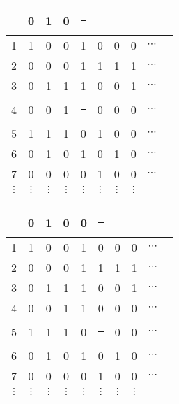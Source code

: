 \documentclass[compress,17pt]{beamer}
\newcommand\hl{\bgroup\markoverwith
    {\textcolor{yellow}{\rule[-.5ex]{.1pt}{2.5ex}}}\ULon}
\begin{document}
\begin{frame}
  \centering
  \begin{tabular}{ | c | c c c c c c c c c }
    \hline
    &  0 & 1 & 0 & \hl 0 \\
    \hline

    1 & 1 & 0 & 0 & 1 & 0 & 0 & 0 & $\cdots$\\
    2 & 0 & 0 & 0 & 1 & 1 & 1 & 1 & $\cdots$\\
    3 & 0 & 1 & 1 & 1 & 0 & 0 & 1 & $\cdots$\\
    4 & 0 & 0 & 1 & \hl 1 & 0 & 0 & 0 & $\cdots$\\
    5 & 1 & 1 & 1 & 0 & 1 & 0 & 0 & $\cdots$\\
    6 & 0 & 1 & 0 & 1 & 0 & 1 & 0 & $\cdots$\\
    7 & 0 & 0 & 0 & 0 & 1 & 0 & 0 & $\cdots$\\
    $\vdots$ & $\vdots$ & $\vdots$ & $\vdots$ & $\vdots$ & $\vdots$ & $\vdots$ & $\vdots$ & \\
  \end{tabular}
\end{frame}

\begin{frame}
  \centering
  \begin{tabular}{ | c | c c c c c c c c c }
    \hline
    &  0 & 1 & 0 & 0 & \hl 0 \\
    \hline

    1 & 1 & 0 & 0 & 1 & 0 & 0 & 0 & $\cdots$\\
    2 & 0 & 0 & 0 & 1 & 1 & 1 & 1 & $\cdots$\\
    3 & 0 & 1 & 1 & 1 & 0 & 0 & 1 & $\cdots$\\
    4 & 0 & 0 & 1 & 1 & 0 & 0 & 0 & $\cdots$\\
    5 & 1 & 1 & 1 & 0 & \hl 1 & 0 & 0 & $\cdots$\\
    6 & 0 & 1 & 0 & 1 & 0 & 1 & 0 & $\cdots$\\
    7 & 0 & 0 & 0 & 0 & 1 & 0 & 0 & $\cdots$\\
    $\vdots$ & $\vdots$ & $\vdots$ & $\vdots$ & $\vdots$ & $\vdots$ & $\vdots$ & $\vdots$ & \\
  \end{tabular}
\end{frame}
\end{document}
